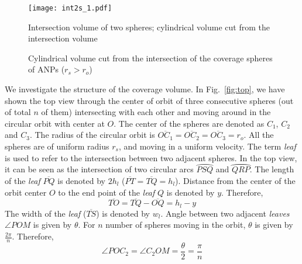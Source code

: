 \documentclass[10pt]{IEEEtran}
\begin{document}
\begin{center}
\begin{figure*}[tbh]
    \begin{minipage}[tbh]{0.35\linewidth}
        \centering
       \texttt{[image: int2s\_1.pdf]}
\caption{Intersection volume of two spheres; cylindrical volume cut from the intersection volume}
\label{fig:int2s}
    \end{minipage}
    \hfill
    \begin{minipage}[tbh]{0.6\linewidth}
        \centering
\hfill
{}
\caption{Cylindrical volume cut from the intersection of the coverage spheres of ANPs ($r_{s}>r_{o}$)}
\label{fig:fig101112}
    \end{minipage}
\end{figure*}
\end{center}

We investigate the structure of the coverage volume. In Fig.~\ref{fig:top}, we have shown the top view through the center of orbit of three consecutive spheres (out of total $n$ of them) intersecting with each other and moving around in the circular orbit with center at $O$. The center of the spheres are denoted as $C_{1}$, $C_{2}$ and $C_{3}$. The radius of the circular orbit is $\overline{OC_{1}} = \overline{OC_{2}} = \overline{OC_{3}} = r_{o}$. All the spheres are of uniform radius $r_{s}$, and moving in a uniform velocity. The term {\em leaf} is used to refer to the intersection between two adjacent spheres. In the top view, it can be seen as the intersection of two circular arcs $\wideparen{PSQ}$ and $\wideparen{QRP}$.  The length of the {\em leaf} $\overline{PQ}$ is denoted by $2h_{l}$ ($\overline{PT} = \overline{TQ} = h_{l}$). Distance from the center of the orbit center $O$ to the end point of the {\em leaf} $Q$ is denoted by $y$. Therefore,
\[
	\overline{TO} = \overline{TQ} - \overline{OQ} = h_{l} - y
\]
The width of the {\em leaf} ($\overline{TS}$) is denoted by $w_{l}$. Angle between two adjacent {\em leaves} $\angle{POM}$ is given by $\theta$. For $n$ number of spheres moving in the orbit, $\theta$ is given by $\frac{2\pi}{n}$. Therefore,
\[
	\angle{POC_{2}} = \angle{C_{2}OM} = \frac{\theta}{2} = \frac{\pi}{n}
\]
\end{document}
